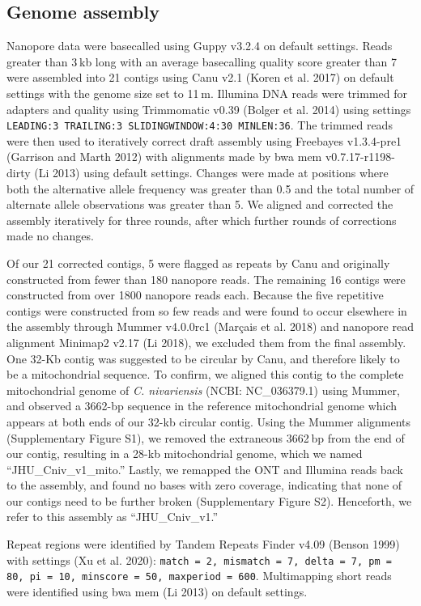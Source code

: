 \subsection{Genome assembly}
\label{sec:methods}

Nanopore data were basecalled using Guppy v3.2.4 on default settings. Reads greater than 3 kb long with an average basecalling quality score greater than 7 were assembled into 21 contigs using Canu v2.1 (Koren et al. 2017) on default settings with the genome size set to 11 m. Illumina DNA reads were trimmed for adapters and quality using Trimmomatic v0.39 (Bolger et al. 2014) using settings \texttt{LEADING:3 TRAILING:3 SLIDINGWINDOW:4:30 MINLEN:36}. The trimmed reads were then used to iteratively correct draft assembly using Freebayes v1.3.4-pre1 (Garrison and Marth 2012) with alignments made by bwa mem v0.7.17-r1198-dirty (Li 2013) using default settings. Changes were made at positions where both the alternative allele frequency was greater than 0.5 and the total number of alternate allele observations was greater than 5. We aligned and corrected the assembly iteratively for three rounds, after which further rounds of corrections made no changes.

Of our 21 corrected contigs, 5 were flagged as repeats by Canu and originally constructed from fewer than 180 nanopore reads. The remaining 16 contigs were constructed from over 1800 nanopore reads each. Because the five repetitive contigs were constructed from so few reads and were found to occur elsewhere in the assembly through Mummer v4.0.0rc1 (Marçais et al. 2018) and nanopore read alignment Minimap2 v2.17 (Li 2018), we excluded them from the final assembly. One 32-Kb contig was suggested to be circular by Canu, and therefore likely to be a mitochondrial sequence. To confirm, we aligned this contig to the complete mitochondrial genome of \textit{C. nivariensis} (NCBI: NC\_036379.1) using Mummer, and observed a 3662-bp sequence in the reference mitochondrial genome which appears at both ends of our 32-kb circular contig. Using the Mummer alignments (Supplementary Figure S1), we removed the extraneous 3662 bp from the end of our contig, resulting in a 28-kb mitochondrial genome, which we named “JHU\_Cniv\_v1\_mito.” Lastly, we remapped the ONT and Illumina reads back to the assembly, and found no bases with zero coverage, indicating that none of our contigs need to be further broken (Supplementary Figure S2). Henceforth, we refer to this assembly as “JHU\_Cniv\_v1.”

Repeat regions were identified by Tandem Repeats Finder v4.09 (Benson 1999) with settings (Xu et al. 2020): \texttt{match = 2, mismatch = 7, delta = 7, pm = 80, pi = 10, minscore = 50, maxperiod = 600}. Multimapping short reads were identified using bwa mem (Li 2013) on default settings.

